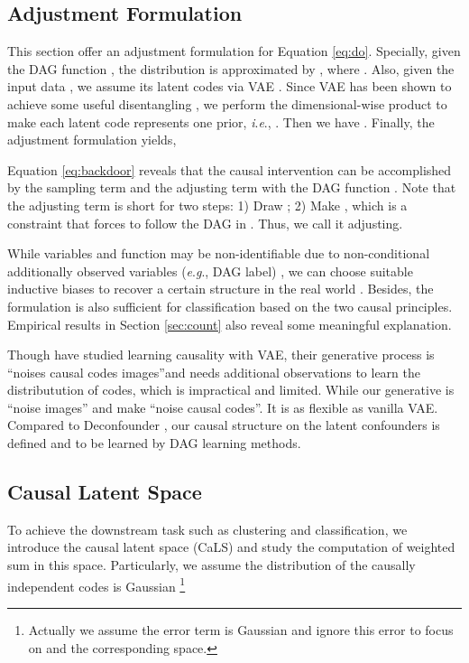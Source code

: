 \documentclass[letterpaper]{article} \usepackage{aaai23}  \usepackage{times}  \usepackage{helvet}  \usepackage{courier}  \usepackage[hyphens]{url}  \usepackage{graphicx} \urlstyle{rm} \def\UrlFont{\rm}  \usepackage{natbib}  \usepackage{caption} \frenchspacing  \setlength{\pdfpagewidth}{8.5in}  \setlength{\pdfpageheight}{11in}  \usepackage{algorithm}
\newcommand{\ie}{\textit{i}.\textit{e}.}
\newcommand{\eg}{\textit{e}.\textit{g}.}
\theoremstyle{plain}
\theoremstyle{definition}
\theoremstyle{remark}
\begin{document}
\subsection{Adjustment Formulation} 
This section offer an adjustment formulation for Equation \ref{eq:do}.
Specially, given the DAG function , the distribution  is approximated by , where . 
Also, given the input data , we assume its latent codes  via VAE \cite{Kingma2014vae}. Since VAE has been shown to achieve some useful disentangling \cite{higgins2016beta}, we perform the dimensional-wise product to make each latent code represents one prior, \ie, . Then we have . Finally, the adjustment formulation yields,

Equation \ref{eq:backdoor} reveals that the causal intervention can be accomplished by the sampling term    and the adjusting term  with the DAG function . Note that the adjusting term is short for two steps: 1) Draw ; 2) Make , which is a constraint that forces  to follow the DAG in . Thus, we call it adjusting.


While variables  and function  may be non-identifiable due to non-conditional additionally observed variables (\eg, DAG label) \cite{khemakhem2020variational}, we can choose suitable inductive biases to recover a certain structure in the real world \cite{locatello2019challenging, pmlr-v139-trauble21a}. Besides, the formulation is also sufficient for classification based on the two causal principles. Empirical results in Section \ref{sec:count} also reveal some meaningful explanation. 

Though \cite{yang2021causalvae, Kim_Shin_Jang_Song_Joo_Kang_Moon_2021} have studied learning causality with VAE, their generative process is ``noises  causal codes  images''and needs additional observations to learn the distributution of codes, which is impractical and limited. While our generative is ``noise  images'' and make ``noise  causal codes''. It is as flexible as vanilla  VAE. Compared to Deconfounder \cite{wang2019blessings}, our causal structure on the latent confounders is defined and to be learned by DAG learning methods.


\subsection{Causal Latent Space}  \label{sec:method-Causal} 
To achieve the downstream task such as {clustering} and {classification}, we introduce the causal latent space (CaLS) and study the computation of weighted sum in this space. Particularly, we assume the distribution of the causally independent codes  is Gaussian \footnote{Actually we assume the error term  is Gaussian and ignore this error to focus on  and the corresponding space.}
	    
\end{document}
